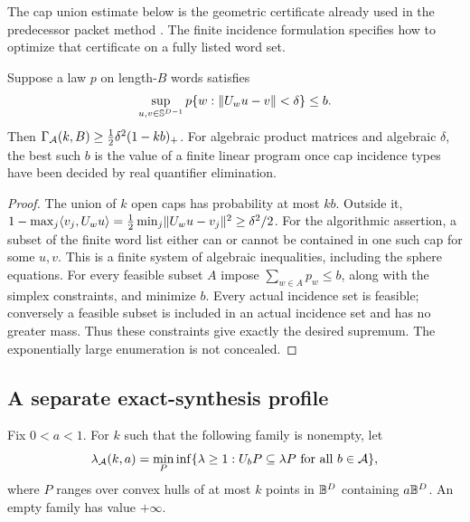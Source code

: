 The cap union estimate below is the geometric certificate already used in the predecessor packet method \cite{GTF35}. The finite incidence formulation specifies how to optimize that certificate on a fully listed word set.

\begin{proposition}\label{prop:caps}
Suppose a law $p$ on length-$B$ words satisfies
\[
 \sup_{u,v\in\mathbb S^{D-1}}p\{w:\lVert U_wu-v\rVert<\delta\}\le b.
\]
Then $\Gamma_{\mathcal A}(k,B)\ge\tfrac12\delta^2(1-kb)_+$. For algebraic product matrices and algebraic $\delta$, the best such $b$ is the value of a finite linear program once cap incidence types have been decided by real quantifier elimination.
\end{proposition}
\begin{proof}
The union of $k$ open caps has probability at most $kb$. Outside it,
$1-\max_j\langle v_j,U_wu\rangle=\tfrac12\min_j\lVert U_wu-v_j\rVert^2\ge\delta^2/2$.
For the algorithmic assertion, a subset of the finite word list either can or cannot be contained in one such cap for some $u,v$. This is a finite system of algebraic inequalities, including the sphere equations. For every feasible subset $A$ impose $\sum_{w\in A}p_w\le b$, along with the simplex constraints, and minimize $b$. Every actual incidence set is feasible; conversely a feasible subset is included in an actual incidence set and has no greater mass. Thus these constraints give exactly the desired supremum. The exponentially large enumeration is not concealed.
\end{proof}

\subsection{A separate exact-synthesis profile}
Fix $0<a<1$. For $k$ such that the following family is nonempty, let
\begin{equation}\label{eq:enclosure-profile}
 \lambda_{\mathcal A}(k,a)=\min_P\inf\{\lambda\ge1:
                  U_bP\subseteq\lambda P\ \text{for all }b\in\mathcal A\},
\end{equation}
where $P$ ranges over convex hulls of at most $k$ points in $\mathbb B^D$ containing $a\mathbb B^D$. An empty family has value $+\infty$.

